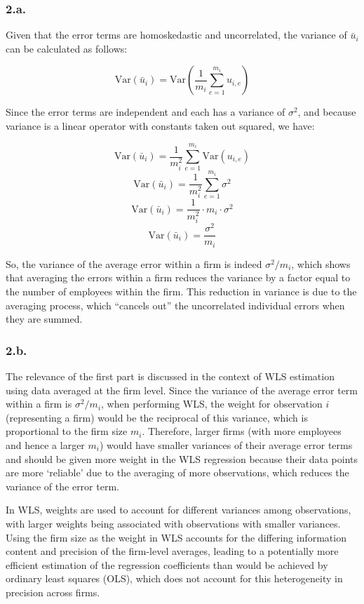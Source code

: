 \documentclass[
]{article}
\begin{document}
\hypertarget{a.-1}{%
\subsubsection{2.a.}\label{a.-1}}

Given that the error terms are homoskedastic and uncorrelated, the
variance of \(\bar{u}_i\) can be calculated as follows:

\[ \text{Var}(\bar{u}_i) = \text{Var}\left(\frac{1}{m_i} \sum_{e=1}^{m_i} u_{i,e}\right) \]

Since the error terms are independent and each has a variance of
\(\sigma^2\), and because variance is a linear operator with constants
taken out squared, we have:

\[ \text{Var}(\bar{u}_i) = \frac{1}{m_i^2} \sum_{e=1}^{m_i} \text{Var}(u_{i,e}) \]
\[ \text{Var}(\bar{u}_i) = \frac{1}{m_i^2} \sum_{e=1}^{m_i} \sigma^2 \]
\[ \text{Var}(\bar{u}_i) = \frac{1}{m_i^2} \cdot m_i \cdot \sigma^2 \]
\[ \text{Var}(\bar{u}_i) = \frac{\sigma^2}{m_i} \]

So, the variance of the average error within a firm is indeed
\(\sigma^2 / m_i\), which shows that averaging the errors within a firm
reduces the variance by a factor equal to the number of employees within
the firm. This reduction in variance is due to the averaging process,
which ``cancels out'' the uncorrelated individual errors when they are
summed.

\hypertarget{b.}{%
\subsubsection{2.b.}\label{b.}}

The relevance of the first part is discussed in the context of WLS
estimation using data averaged at the firm level. Since the variance of
the average error term within a firm is \(\sigma^2 / m_i\), when
performing WLS, the weight for observation \(i\) (representing a firm)
would be the reciprocal of this variance, which is proportional to the
firm size \(m_i\). Therefore, larger firms (with more employees and
hence a larger \(m_i\)) would have smaller variances of their average
error terms and should be given more weight in the WLS regression
because their data points are more `reliable' due to the averaging of
more observations, which reduces the variance of the error term.

In WLS, weights are used to account for different variances among
observations, with larger weights being associated with observations
with smaller variances. Using the firm size as the weight in WLS
accounts for the differing information content and precision of the
firm-level averages, leading to a potentially more efficient estimation
of the regression coefficients than would be achieved by ordinary least
squares (OLS), which does not account for this heterogeneity in
precision across firms.
\end{document}
